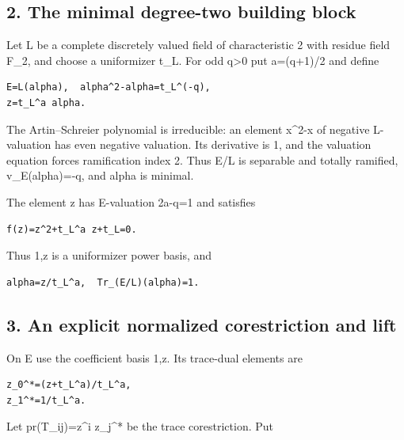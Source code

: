 \hypertarget{dyadic_tower-the-minimal-degree-two-building-block}{%
\subsection{2. The minimal degree-two building
block}\label{dyadic_tower-the-minimal-degree-two-building-block}}

Let L be a complete discretely valued field of characteristic 2 with
residue field F\_2, and choose a uniformizer t\_L. For odd
q\textgreater0 put a=(q+1)/2 and define

\begin{Verbatim}[fontsize=\small,breaklines=true,breakanywhere=true]
E=L(alpha),  alpha^2-alpha=t_L^(-q),
z=t_L^a alpha.
\end{Verbatim}

The Artin--Schreier polynomial is irreducible: an element x\^{}2-x of
negative L-valuation has even negative valuation. Its derivative is 1,
and the valuation equation forces ramification index 2. Thus E/L is
separable and totally ramified, v\_E(alpha)=-q, and alpha is minimal.

The element z has E-valuation 2a-q=1 and satisfies

\begin{Verbatim}[fontsize=\small,breaklines=true,breakanywhere=true]
f(z)=z^2+t_L^a z+t_L=0.
\end{Verbatim}

Thus 1,z is a uniformizer power basis, and

\begin{Verbatim}[fontsize=\small,breaklines=true,breakanywhere=true]
alpha=z/t_L^a,  Tr_(E/L)(alpha)=1.
\end{Verbatim}

\hypertarget{dyadic_tower-an-explicit-normalized-corestriction-and-lift}{%
\subsection{3. An explicit normalized corestriction and
lift}\label{dyadic_tower-an-explicit-normalized-corestriction-and-lift}}

On E use the coefficient basis 1,z. Its trace-dual elements are

\begin{Verbatim}[fontsize=\small,breaklines=true,breakanywhere=true]
z_0^*=(z+t_L^a)/t_L^a,
z_1^*=1/t_L^a.
\end{Verbatim}

Let pr(T\_ij)=z\^{}i z\_j\^{}* be the trace corestriction. Put


